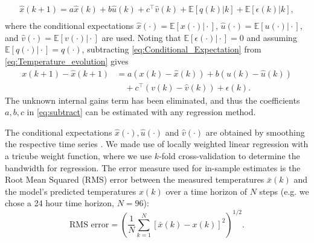 \begin{equation}\label{eq:Conditional_Expectation}
\begin{aligned}
\hat{x}(k+1) = a\hat{x}(k) + b\hat{u}(k) + c^\top\hat{v}(k) + \mathbb{E}\left[ q(k) \vert k \right] + \mathbb{E}\left[ \epsilon(k) \vert k \right],\\
\end{aligned}
\end{equation}
\noindent
where the conditional expectations $\hat{x}(\cdot) = \mathbb{E}\left[ x(\cdot) \vert \cdot \right]$, $\hat{u}(\cdot) = \mathbb{E}\left[ u(\cdot) \vert \cdot \right]$, and $\hat{v}(\cdot) = \mathbb{E}\left[ v(\cdot) \vert \cdot \right]$ are used.
Noting that $\mathbb{E}\left[ \epsilon(\cdot) \vert \cdot \right] = 0$ and assuming $\mathbb{E}\left[ q(\cdot) \vert \cdot \right] = q(\cdot)$, subtracting \eqref{eq:Conditional_Expectation} from \eqref{eq:Temperature_evolution} gives
\begin{equation}\label{eq:subtract}
\begin{aligned}
x(k+1) - \hat{x}(k+1) &= a\left( x(k) - \hat{x}(k) \right) + b\left( u(k) - \hat{u}(k) \right)\\
&\quad+ c^\top \left( v(k) - \hat{v}(k) \right) + \epsilon(k).
\end{aligned}
\end{equation}
The unknown internal gains term has been eliminated, and thus the coefficients $a, b, c$ in \eqref{eq:subtract} can be estimated with any regression method.

The conditional expectations $\hat{x}(\cdot), \hat{u}(\cdot)$ and $\hat{v}(\cdot)$ are obtained by smoothing the respective time series \cite{Aswani:2012aa}. We made use of locally weighted linear regression with a tricube weight function, where we use $k$-fold cross-validation to determine the bandwidth for regression.
The error measure used for in-sample estimates is the Root Mean Squared (RMS) error between the measured temperatures $\bar{x}(k)$ and the model's predicted temperatures $x(k)$ over a time horizon of $N$ steps (e.g. we chose a 24 hour time horizon, $N = 96$):
\begin{equation}\label{eq:RMS}
\text{RMS error} = \left(\frac{1}{N}\textstyle\sum_{k=1}^N \left[\bar{x}(k) - x(k)\right]^2 \right)^{1/2}.
\end{equation}
